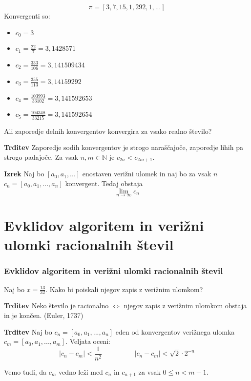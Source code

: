 \documentclass{beamer}
\newcommand{\N}{\mathbb{N}}
\newenvironment{iz}{\begin{block}{\textbf{Izrek}}}{\end{block}}
\newenvironment{trd}{\begin{block}{\textbf{Trditev}}}{\end{block}}
\begin{document}
\begin{frame}
\[ \pi = [3, 7, 15, 1, 292, 1, ...] \] \pause
Konvergenti so:
	\begin{itemize}
	\item $c_0 = 3$
	\item $c_1 = \frac{22}{7} = 3,1428571$
	\item $c_2 = \frac{333}{106} = 3,141509434$
	\item $c_3 = \frac{355}{113} = 3,14159292$
	\item $c_4 = \frac{103993}{33102} = 3,141592653$
	\item $c_5 = \frac{104348}{33215} = 3,141592654$
	\end{itemize}
	\vspace{5mm}
\pause
Ali zaporedje delnih konvergentov konvergira za vsako realno število?
\end{frame}

\begin{frame}
	\begin{trd}
	Zaporedje sodih konvergentov je strogo naraščajoče, zaporedje lihih pa strogo padajoče. Za vsak $n, m \in \N$ je  $c_{2n} < c_{2m+1}.$
	\end{trd}    \pause
	\begin{iz}
	Naj bo $[a_0, a_1, ...]$ enostaven verižni ulomek in naj bo za vsak $n$ $c_n = [a_0, a_1, ..., a_n]$ konvergent. Tedaj obstaja $$\lim_{n\to\infty}c_n$$
	\end{iz}
\end{frame}

\section{Evklidov algoritem in verižni ulomki racionalnih števil}

\begin{frame}
\frametitle{Evklidov algoritem in verižni ulomki racionalnih števil}
Naj bo $x = \frac{13}{32}$. Kako bi poiskali njegov zapis z verižnim ulomkom?
\pause
	\begin{trd}
	Neko število je racionalno $\Leftrightarrow$ njegov zapis z verižnim ulomkom obstaja in je končen. (Euler, 1737)
	\end{trd}
\end{frame}

\begin{frame}
	\begin{trd}
	Naj bo $c_n = [a_0, a_1, ..., a_n]$ eden od konvergentov verižnega ulomka $c_m = [a_0, a_1, ..., a_m]$. Veljata oceni: \[ |c_n-c_m|<\frac{1}{n^2} \hspace{2cm}|c_n-c_m|<\sqrt{2}\cdot 2^{-n} \]
	\end{trd}
	\vspace{5mm}
	Vemo tudi, da $c_m$ vedno leži med $c_n$ in $c_{n+1}$ za vsak $0\leq n < m-1$.
\end{frame}
\end{document}
